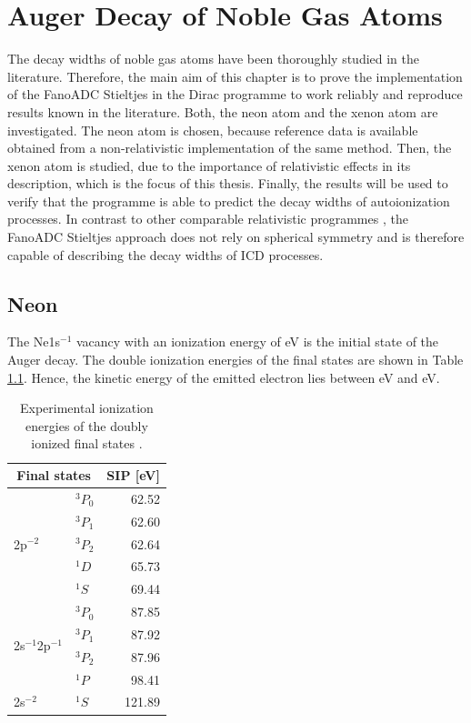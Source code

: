 \chapter{Auger Decay of Noble Gas Atoms}
The decay widths of noble gas atoms have been thoroughly studied in the
literature. Therefore, the main aim of this chapter is to prove the implementation
of the FanoADC Stieltjes in the Dirac programme \cite{DIRAC13} to work
reliably and reproduce results known in the literature. Both, the neon atom
and the xenon atom are investigated.
The neon atom is chosen, because reference data is available
obtained from a non-relativistic
implementation of the same method. Then, the xenon atom is studied, due
to the importance of relativistic effects in its description, which is
the focus of this thesis.
Finally, the results will be used to verify that the programme is
able to predict the decay widths of autoionization processes.
In contrast to other comparable relativistic programmes
\cite{Tulkki92,Fritzsche12}, the FanoADC Stieltjes approach does not
rely on spherical symmetry and is therefore capable of describing
the decay widths of \ac{ICD} processes.


\section{Neon}

The Ne1s$^{-1}$ vacancy with an ionization energy of \unit[870]{eV}
\cite{Saethre84} is
the initial state of the Auger decay. The double ionization energies of
the final states are shown in Table \ref{table:Ne_dips}. Hence, the
kinetic energy of the emitted electron lies between
\unit[748]{eV} and \unit[808]{eV}.

\begin{table}[h]
  \centering
  \caption{Experimental ionization energies of the doubly ionized final states
           \cite{NIST2014}.}
  \begin{tabular}{llr}
   \toprule
   \multicolumn{2}{c}{Final states} & \acs{SIP} [eV]\\
   \midrule
   \multirow{5}{*}{2p$^{-2}$} & $^3P_0$        & 62.52 \\
                              & $^3P_1$        & 62.60 \\
                              & $^3P_2$        & 62.64 \\
                              & $^1D$          & 65.73 \\
                              & $^1S$          & 69.44 \\
   \midrule
 \multirow{4}{*}{2s$^{-1}$2p$^{-1}$} & $^3P_0$ & 87.85 \\
                              & $^3P_1$        & 87.92 \\
                              & $^3P_2$        & 87.96 \\
                              & $^1P$          & 98.41 \\
   \midrule                                    
      2s$^{-2}$               & $^1S$          &121.89 \\
   \bottomrule
  \end{tabular}
  \label{table:Ne_dips}
\end{table}

